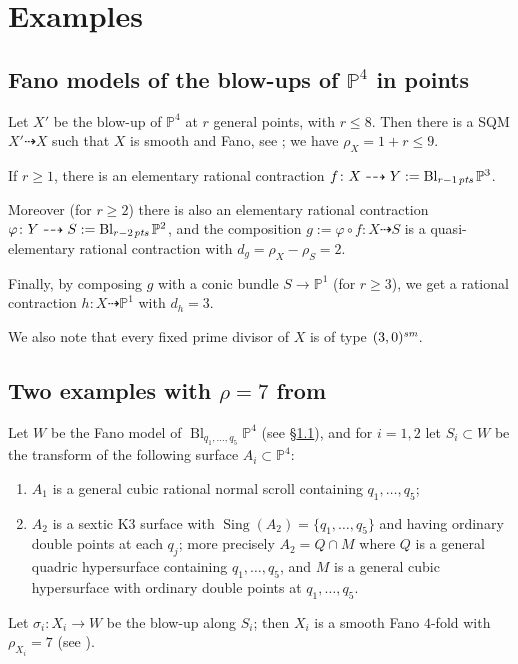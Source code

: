 \documentclass[a4paper,12pt]{amsart}
\theoremstyle{definition}
\numberwithin{figure}{section}
\numberwithin{table}{section}
\newcommand{\ph}{\varphi}
\newcommand{\pr}{\mathbb{P}}
\newcommand{\Sing}{\operatorname{Sing}}
\newcommand{\Bl}{\operatorname{Bl}}
\newcommand{\sm}{\text{\it sm}}
\newcommand{\pts}{\text{\it pts}}
\begin{document}
  \section{Examples}\label{secexamples}
  \subsection{Fano models of the blow-ups of $\pr^4$ in points}\label{fanomodel}
\noindent Let $X'$ be the blow-up of $\pr^4$ at $r$ general points, with $r\leq 8$. Then there is a SQM $X'\dasharrow X$ such that $X$ is smooth and Fano, see \cite[Ex.~7.2 and references therein]{3folds}; we have
 $\rho_X=1+r\leq 9$.

 If $r\geq 1$, there is an elementary rational contraction $f\colon X\dasharrow Y:=\Bl_{r-1\mskip2mu\pts}\pr^3$.

 Moreover (for $r\geq 2$) there is also 
an
elementary rational contraction $\ph\colon Y\dasharrow S:=\Bl_{r-2\mskip2mu\pts}\pr^2$, and the composition $g:=\ph\circ f\colon X\dasharrow S$ is a quasi-elementary rational contraction with $d_g=\rho_X-\rho_S=2$.

Finally, by composing $g$ with a conic bundle $S\to\pr^1$ (for $r\geq 3$), we get a rational contraction $h\colon X\dasharrow\pr^1$ with $d_h=3$.

 We also note that every fixed prime divisor of $X$ is of type $(3,0)^{\sm}$.
\subsection{Two examples with $\rho=7$ from \cite{3folds}}\label{newex}
\noindent Let $W$ be the Fano model of $\Bl_{q_1,\dotsc,q_5}\pr^4$ (see \S\ref{fanomodel}), and for $i=1,2$ let
$S_i\subset W$ be the transform of the following surface $A_i\subset\pr^4$:
\begin{enumerate}[$\bullet$]
\item $A_1$ is a general cubic rational normal scroll containing $q_1,\dotsc,q_5$;
\item $A_2$ is a sextic K3 surface with $\Sing(A_2)=\{q_1,\dotsc,q_5\}$ and having ordinary double points at each $q_j$; more precisely
$A_2 =Q\cap M$ where $Q$ is a general quadric hypersurface containing $q_1,\dotsc,q_5$, and $M$ is a general cubic hypersurface with ordinary double points at $q_1,\dotsc,q_5$. 
\end{enumerate}  
 Let $\sigma_i\colon X_i\to W$ be the blow-up along $S_i$;
then $X_i$ is a smooth Fano $4$-fold with $\rho_{X_i}=7$ 
(see \cite[\S7.2 and \S7.3]{3folds}).
\end{document}
